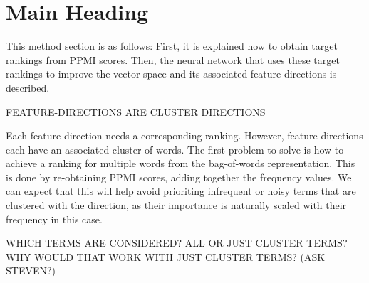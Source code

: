 \documentclass{article}
\begin{document}
\section{Main Heading}

This method section is as follows: First, it is explained how to obtain target rankings from PPMI scores. Then, the neural network that uses these target rankings to improve the vector space and its associated feature-directions is described.



FEATURE-DIRECTIONS ARE CLUSTER DIRECTIONS


Each feature-direction needs a corresponding ranking. However, feature-directions each have an associated cluster of words. The first problem to solve is how to achieve a ranking for multiple words from the bag-of-words representation. This is done by re-obtaining PPMI scores, adding together the frequency values. We can expect that this will help avoid prioriting infrequent or noisy terms that are clustered with the direction, as their importance is naturally scaled with their frequency in this case. 

WHICH TERMS ARE CONSIDERED? ALL OR JUST CLUSTER TERMS? WHY WOULD THAT WORK WITH JUST CLUSTER TERMS? (ASK STEVEN?)




%
%
\end{document}
